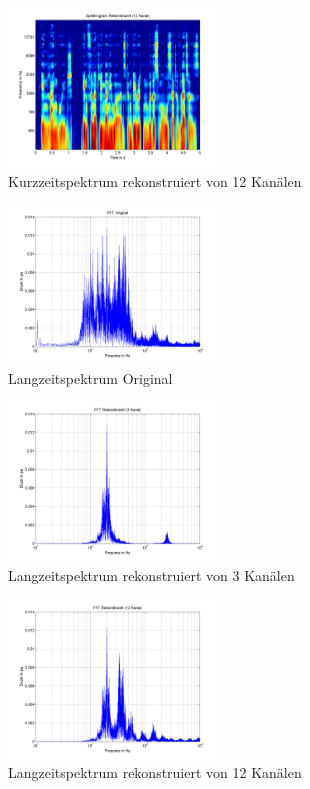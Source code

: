 \documentclass[conference]{IEEEtran}
\begin{document}
\begin{figure}[h]
	\centering
	\includegraphics[width=0.5\textwidth]{img/spect_rec_12.png}
	\caption{Kurzzeitspektrum rekonstruiert von 12 Kanälen}
	\label{fig:spect-rec-12}
\end{figure}

\begin{figure}[h]
	\centering
	\includegraphics[width=0.5\textwidth]{img/fft_orig.png}
	\caption{Langzeitspektrum Original}
	\label{fig:fft-orig}
\end{figure}

\begin{figure}[h]
	\centering
	\includegraphics[width=0.5\textwidth]{img/fft_rec_3.png}
	\caption{Langzeitspektrum rekonstruiert von 3 Kanälen}
	\label{fig:fft-rec-3}
\end{figure}

\begin{figure}[h]
	\centering
	\includegraphics[width=0.5\textwidth]{img/fft_rec_12.png}
	\caption{Langzeitspektrum rekonstruiert von 12 Kanälen}
	\label{fig:fft-rec-12}
\end{figure}
\end{document}
